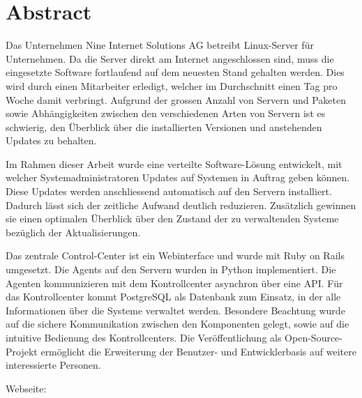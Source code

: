 \begin{comment}
2.1.2 Abstract
Ein Abstract ist eine rein textuelle kurze Zusammenfassung der Arbeit. Der Abstract ist für die Recherche in grossen Dokumentensammlungen geeignet. Er umfasst nie mehr als eine Seite, typisch sogar nur etwa 200 Worte (etwa 20 Zeilen).
Der Begriff ‚Kurzfassung’ ist zuwenig genau definiert; er soll wenn möglich vermieden werden.


“Der Abstract richtet sich an den Spezialisten auf dem entsprechenden Gebiet und beschreibt daher in erster Linie die (neuen, eigenen) Ergebnisse und Resultate der Arbeit. Es umfasst nie mehr als eine Seite, typisch sogar nur etwa 200 Worte (etwa 20 Zeilen). Es sind keine Bilder zu verwenden.” (Anleitung: Dokumentation Studien- und Bachelorarbeiten)

Offene Fragen:
- Mehr zur Umsetzung?
- Nutzen für den obigen Mitarbeiter? Zeitersparnis, Überblick?

\end{comment}

{}
\chapter*{Abstract}

Das Unternehmen Nine Internet Solutions AG betreibt Linux-Server für Unternehmen. Da die Server direkt am Internet angeschlossen sind, muss die eingesetzte Software fortlaufend auf dem neuesten Stand gehalten werden. Dies wird durch einen Mitarbeiter erledigt, welcher im Durchschnitt einen Tag pro Woche damit verbringt. Aufgrund der grossen Anzahl von Servern und Paketen sowie Abhängigkeiten zwischen den verschiedenen Arten von Servern ist es schwierig, den Überblick über die installierten Versionen und anstehenden Updates zu behalten.

Im Rahmen dieser Arbeit wurde eine verteilte Software-Lösung entwickelt, mit welcher Systemadministratoren Updates auf Systemen in Auftrag geben können. Diese Updates werden anschliessend automatisch auf den Servern installiert. Dadurch lässt sich der zeitliche Aufwand deutlich reduzieren. Zusätzlich gewinnen sie einen optimalen Überblick über den Zustand der zu verwaltenden Systeme bezüglich der Aktualisierungen.

Das zentrale Control-Center ist ein Webinterface und wurde mit Ruby on Rails umgesetzt. Die Agents auf den Servern wurden in Python implementiert. Die Agenten kommunizieren mit dem Kontrollcenter asynchron über eine API. Für das Kontrollcenter kommt PostgreSQL als Datenbank zum Einsatz, in der alle Informationen über die Systeme verwaltet werden. Besondere Beachtung wurde auf die sichere Kommunikation zwischen den Komponenten gelegt, sowie auf die intuitive Bedienung des Kontrollcenters. Die Veröffentlichung als Open-Source-Projekt ermöglicht die Erweiterung der Benutzer- und Entwicklerbasis auf weitere interessierte Personen.

\bigskip
Webseite: 

\glsresetall
